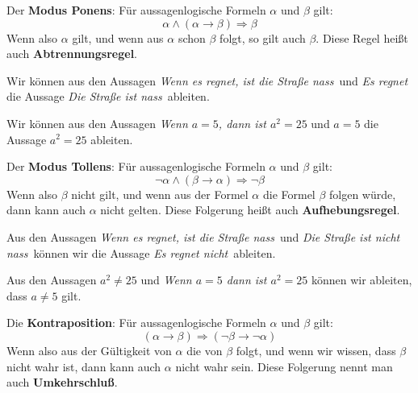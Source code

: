 \begin{regel} Der \textbf{Modus Ponens}: Für aussagenlogische Formeln $\alpha$ und $\beta$ gilt: 
  	$$ \alpha \wedge ( \alpha \rightarrow \beta) \Longrightarrow \beta $$
Wenn also $\alpha$ gilt, und wenn aus $\alpha$ schon $\beta$ folgt, so gilt auch $\beta$.
Diese Regel heißt auch \textbf{Abtrennungsregel}. 
\end{regel}

\begin{beispiel} Wir können aus den Aussagen 
\textit{Wenn es regnet, ist die Straße nass\,} und \textit{Es regnet\,} die Aussage \textit{Die Straße ist 
nass\,} ableiten.
\end{beispiel}

\begin{beispiel} Wir können aus den Aussagen \textit{Wenn $a = 5$, dann ist $a^2 = 25$} und \textit{$a = 5$} 
die Aussage \textit{$a^2 = 25$} ableiten.
\end{beispiel}


\begin{regel} Der \textbf{Modus Tollens}: Für aussagenlogische Formeln $\alpha$ und $\beta$ gilt: 
  	$$ \neg \alpha \wedge ( \beta \longrightarrow \alpha) \Longrightarrow \neg \beta $$
Wenn also $\beta$ nicht gilt, und wenn aus der Formel $\alpha$ die Formel $\beta$ folgen würde, dann kann 
auch $\alpha$ nicht gelten.
Diese Folgerung heißt auch \textbf{Aufhebungsregel}. 
\end{regel}

\begin{beispiel} Aus den Aussagen 
\textit{Wenn es regnet, ist die Straße nass\,} und \textit{Die Straße ist nicht nass\,} 
können wir die Aussage 
\textit{Es regnet nicht\,} ableiten.
\end{beispiel}

\begin{beispiel} Aus den Aussagen $a^2 \neq 25$ und \textit{Wenn $a=5$ dann ist $a^2 = 25$} können wir 
ableiten, dass $a \neq 5$ gilt.
\end{beispiel}

\begin{regel} Die \textbf{Kontraposition}: Für aussagenlogische Formeln $\alpha$ und $\beta$ gilt: 
  	$$ (\alpha \longrightarrow \beta) \Longrightarrow ( \neg \beta \longrightarrow \neg \alpha ) $$
Wenn also aus der Gültigkeit von $\alpha$ die von $\beta$ folgt, und wenn wir wissen, dass $\beta$ nicht wahr 
ist, dann kann auch $\alpha$ nicht wahr sein.
Diese Folgerung nennt man auch \textbf{Umkehrschluß}. 
\end{regel}


